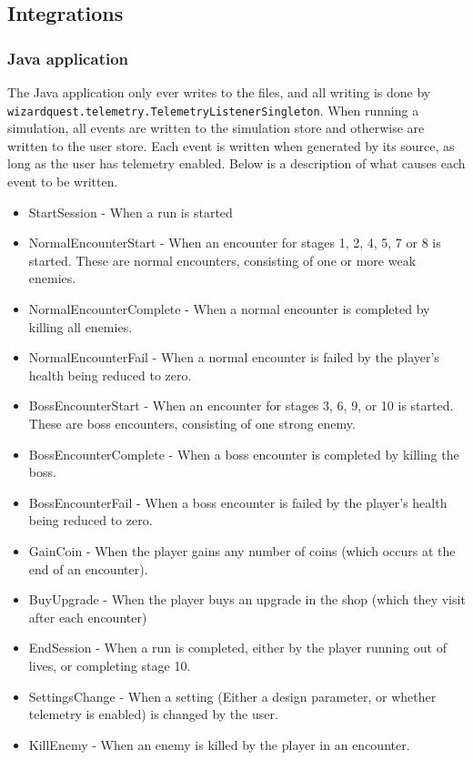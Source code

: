\documentclass[11pt]{article}
\begin{document}
\subsection{Integrations}

\subsubsection{Java application}
The Java application only ever writes to the files, and all writing is done by \verb|wizardquest.telemetry.TelemetryListenerSingleton|. When running a simulation, all events are written to the simulation store and otherwise are written to the user store. Each event is written when generated by its source, as long as the user has telemetry enabled. Below is a description of what causes each event to be written.
\begin{itemize}
  \item StartSession - When a run is started
  \item NormalEncounterStart - When an encounter for stages 1, 2, 4, 5, 7 or 8 is started. These are normal encounters, consisting of one or more weak enemies.
  \item NormalEncounterComplete - When a normal encounter is completed by killing all enemies.
  \item NormalEncounterFail - When a normal encounter is failed by the player's health being reduced to zero.
  \item BossEncounterStart - When an encounter for stages 3, 6, 9, or 10 is started. These are boss encounters, consisting of one strong enemy.
  \item BossEncounterComplete - When a boss encounter is completed by killing the boss.
  \item BossEncounterFail -  When a boss encounter is failed by the player's health being reduced to zero.
  \item GainCoin - When the player gains any number of coins (which occurs at the end of an encounter).
  \item BuyUpgrade - When the player buys an upgrade in the shop (which they visit after each encounter)
  \item EndSession - When a run is completed, either by the player running out of lives, or completing stage 10.
  \item SettingsChange - When a setting (Either a design parameter, or whether telemetry is enabled) is changed by the user.
  \item KillEnemy - When an enemy is killed by the player in an encounter.
\end{itemize}
\end{document}
